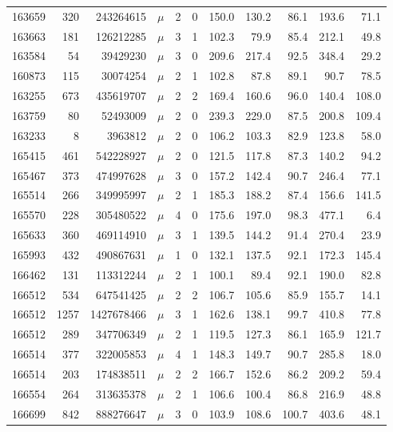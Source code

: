 \begin{table}[htb]
\begin{center}
\begin{tabular}{rrrrrrrrrrr}
163659 & 320 &  243264615 &  $\mu$ & 2 & 0 & 150.0 & 130.2 &  86.1 & 193.6 &  71.1\\
163663 & 181 &  126212285 &  $\mu$ & 3 & 1 & 102.3 &  79.9 &  85.4 & 212.1 &  49.8\\
163584 &  54 &   39429230 &  $\mu$ & 3 & 0 & 209.6 & 217.4 &  92.5 & 348.4 &  29.2\\
160873 & 115 &   30074254 &  $\mu$ & 2 & 1 & 102.8 &  87.8 &  89.1 &  90.7 &  78.5\\
163255 & 673 &  435619707 &  $\mu$ & 2 & 2 & 169.4 & 160.6 &  96.0 & 140.4 & 108.0\\
163759 &  80 &   52493009 &  $\mu$ & 2 & 0 & 239.3 & 229.0 &  87.5 & 200.8 & 109.4\\
163233 &   8 &    3963812 &  $\mu$ & 2 & 0 & 106.2 & 103.3 &  82.9 & 123.8 &  58.0\\
165415 & 461 &  542228927 &  $\mu$ & 2 & 0 & 121.5 & 117.8 &  87.3 & 140.2 &  94.2\\
165467 & 373 &  474997628 &  $\mu$ & 3 & 0 & 157.2 & 142.4 &  90.7 & 246.4 &  77.1\\
165514 & 266 &  349995997 &  $\mu$ & 2 & 1 & 185.3 & 188.2 &  87.4 & 156.6 & 141.5\\
165570 & 228 &  305480522 &  $\mu$ & 4 & 0 & 175.6 & 197.0 &  98.3 & 477.1 &   6.4\\
165633 & 360 &  469114910 &  $\mu$ & 3 & 1 & 139.5 & 144.2 &  91.4 & 270.4 &  23.9\\
165993 & 432 &  490867631 &  $\mu$ & 1 & 0 & 132.1 & 137.5 &  92.1 & 172.3 & 145.4\\
166462 & 131 &  113312244 &  $\mu$ & 2 & 1 & 100.1 &  89.4 &  92.1 & 190.0 &  82.8\\
166512 & 534 &  647541425 &  $\mu$ & 2 & 2 & 106.7 & 105.6 &  85.9 & 155.7 &  14.1\\
166512 & 1257 & 1427678466 &  $\mu$ & 3 & 1 & 162.6 & 138.1 &  99.7 & 410.8 &  77.8\\
166512 & 289 &  347706349 &  $\mu$ & 2 & 1 & 119.5 & 127.3 &  86.1 & 165.9 & 121.7\\
166514 & 377 &  322005853 &  $\mu$ & 4 & 1 & 148.3 & 149.7 &  90.7 & 285.8 &  18.0\\
166514 & 203 &  174838511 &  $\mu$ & 2 & 2 & 166.7 & 152.6 &  86.2 & 209.2 &  59.4\\
166554 & 264 &  313635378 &  $\mu$ & 2 & 1 & 106.6 & 100.4 &  86.8 & 216.9 &  48.8\\
166699 & 842 &  888276647 &  $\mu$ & 3 & 0 & 103.9 & 108.6 & 100.7 & 403.6 &  48.1\\

\end{tabular}
\end{center}
\end{table}
